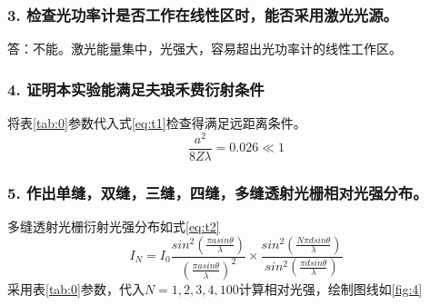 \documentclass[12pt,a4paper,UTF8]{ctexart}
\begin{document}
\subsubsection*{3. 检查光功率计是否工作在线性区时，能否采用激光光源。}
答：不能。激光能量集中，光强大，容易超出光功率计的线性工作区。
\subsubsection*{4. 证明本实验能满足夫琅禾费衍射条件}
将表\ref{tab:0}参数代入式\ref{eq:t1}检查得满足远距离条件。
\begin{equation}\label{eq:t1}
	\frac{a^2}{8Z\lambda} = 0.026 \ll 1
\end{equation}
\subsubsection*{5. 作出单缝，双缝，三缝，四缝，多缝透射光栅相对光强分布。}
多缝透射光栅衍射光强分布如式\ref{eq:t2}
\begin{equation}\label{eq:t2}
	I_N = I_0\frac{sin^2(\frac{\pi asin \theta}{\lambda})}{(\frac{\pi asin \theta}{\lambda})^2} \times \frac{sin^2(\frac{N\pi dsin \theta}{\lambda})}{sin^2(\frac{\pi dsin \theta}{\lambda})}
\end{equation}
采用表\ref{tab:0}参数，代入$N = 1,2,3,4,100$计算相对光强，绘制图线如\ref{fig:4}
\newpage
\end{document}
